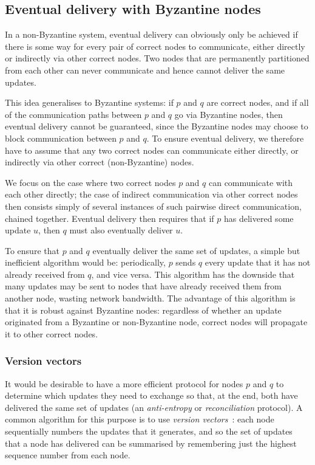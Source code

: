 \documentclass[sigplan,review]{acmart}
\begin{document}
\subsection{Eventual delivery with Byzantine nodes}\label{sec:delivery}

In a non-Byzantine system, eventual delivery can obviously only be achieved if there is some way for every pair of correct nodes to communicate, either directly or indirectly via other correct nodes.
Two nodes that are permanently partitioned from each other can never communicate and hence cannot deliver the same updates.

This idea generalises to Byzantine systems: if $p$ and $q$ are correct nodes, and if all of the communication paths between $p$ and $q$ go via Byzantine nodes, then eventual delivery cannot be guaranteed, since the Byzantine nodes may choose to block communication between $p$ and $q$.
To ensure eventual delivery, we therefore have to assume that any two correct nodes can communicate either directly, or indirectly via other correct (non-Byzantine) nodes.

We focus on the case where two correct nodes $p$ and $q$ can communicate with each other directly; the case of indirect communication via other correct nodes then consists simply of several instances of such pairwise direct communication, chained together.
Eventual delivery then requires that if $p$ has delivered some update $u$, then $q$ must also eventually deliver $u$.

To ensure that $p$ and $q$ eventually deliver the same set of updates, a simple but inefficient algorithm would be: periodically, $p$ sends $q$ every update that it has not already received from $q$, and vice versa.
This algorithm has the downside that many updates may be sent to nodes that have already received them from another node, wasting network bandwidth.
The advantage of this algorithm is that it is robust against Byzantine nodes: regardless of whether an update originated from a Byzantine or non-Byzantine node, correct nodes will propagate it to other correct nodes.

\subsubsection{Version vectors}\label{sec:vectors}

It would be desirable to have a more efficient protocol for nodes $p$ and $q$ to determine which updates they need to exchange so that, at the end, both have delivered the same set of updates (an \emph{anti-entropy} or \emph{reconciliation} protocol).
A common algorithm for this purpose is to use \emph{version vectors}~\cite{ParkerJr:1983}: each node sequentially numbers the updates that it generates, and so the set of updates that a node has delivered can be summarised by remembering just the highest sequence number from each node.
\end{document}
